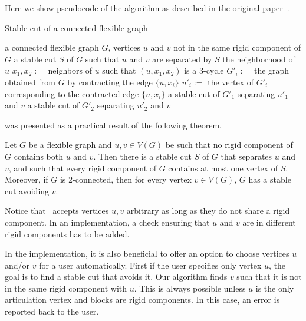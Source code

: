Here we show pseudocode of the algorithm as described
in the original paper~\cite{stable_cuts_legersky}.
%
\begin{algorithm}[ht]
	\caption{Stable cut of a connected flexible graph}%
	\label{alg:stable_cut_flexible}%
	\begin{algorithmic}[1]
		\Require{} a connected flexible graph $G$, vertices $u$ and $v$ not in the same rigid component of $G$
		\Ensure{} a stable cut $S$ of $G$ such that $u$ and $v$ are separated by $S$
		\State\Return{} the neighborhood of $u$
		\Else{}
		\State{} $x_1,x_2 :={}$ neighbors of $u$ such that $(u,x_1,x_2)$  is a $3$-cycle
		\State{} $G'_i :={}$ the graph obtained from $G$ by contracting the edge $\{u, x_i\}$
		\State{} $u'_i :={}$ the vertex of $G'_i$ corresponding to the contracted edge $\{u, x_i\}$
		\EndFor{}
		\State\Return{} a stable cut of $G'_1$ separating $u'_1$ and $v$
		\Else{}
		\State\Return{} a stable cut of $G'_2$ separating $u'_2$ and $v$
		\EndIf{}
		\EndIf{}
	\end{algorithmic}
\end{algorithm}
%

was presented as a practical result of the following theorem.
%
\begin{theorem}
	Let \( G \) be a flexible graph and \( u, v \in V (G) \) be such that no rigid component of \( G \)
	contains both \( u \) and \( v \). Then there is a stable cut \( S \) of \( G \) that separates \( u \) and \( v \), and such that
	every rigid component of \( G \) contains at most one vertex of \( S \). Moreover, if \( G \) is 2-connected,
	then for every vertex \( v \in V(G) \), \( G \) has a stable cut avoiding \( v \).
\end{theorem}
%

Notice that~
accepts vertices \( u, v \) arbitrary as long as they do not share a rigid component.
In an implementation, a check ensuring that \( u \) and \( v \)
are in different rigid components has to be added.

In the implementation, it is also beneficial to offer an option to choose
vertices \( u \) and/or \(  v \) for a user automatically.
First if the user specifies only vertex \( u \), the goal is to find a stable cut
that avoids it. Our algorithm finds \( v \)
such that it is not in the same rigid component with \( u \).
This is always possible unless \( u \) is the only articulation vertex
and blocks are rigid components. In this case, an error is reported back to the user.

